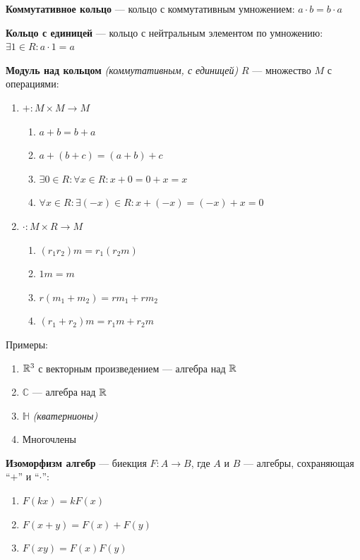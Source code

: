 \textbf{Коммутативное кольцо} --- кольцо с коммутативным умножением: $a\cdot b = b\cdot a$

\textbf{Кольцо с единицей} --- кольцо с нейтральным элементом по умножению: $\exists 1\in R : a\cdot 1 = a$

\textbf{Модуль над кольцом} \textit{(коммутативным, с единицей)} $R$ --- множество $M$ с операциями:
\begin{enumerate}
    \item $+:M\times M\to M$ \begin{enumerate}
              \item $a+b=b+a$
              \item $a+(b+c)=(a+b)+c$
              \item $\exists 0\in R : \forall x\in R : x + 0 = 0 + x = x$
              \item $\forall x\in R : \exists (-x)\in R : x + (-x) = (-x) + x = 0$
          \end{enumerate}
    \item $\cdot : M\times R\to M$ \begin{enumerate}
              \item $(r_1r_2)m=r_1(r_2m)$
              \item $1m=m$
              \item $r(m_1+m_2)=rm_1+rm_2$
              \item $(r_1+r_2)m=r_1m+r_2m$
          \end{enumerate}
\end{enumerate}

Примеры:
\begin{enumerate}
    \item $\mathbb{R}^3$ с векторным произведением --- алгебра над $\mathbb{R}$
    \item $\mathbb{C}$ --- алгебра над $\mathbb{R}$
    \item $\mathbb H$ \textit{(кватернионы)}
    \item Многочлены
\end{enumerate}

\textbf{Изоморфизм алгебр} --- биекция $F : A\to B$, где $A$ и $B$ --- алгебры, сохраняющая ``$+$'' и ``$\cdot$'':
\begin{enumerate}
    \item $F(kx)=kF(x)$
    \item $F(x + y) = F(x) + F(y)$
    \item $F(xy) = F(x)F(y)$
\end{enumerate}

